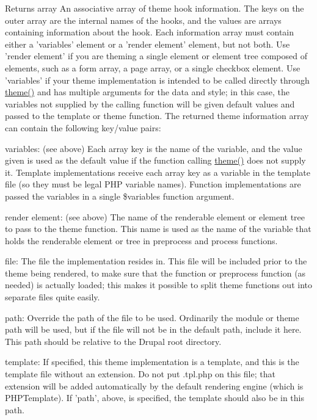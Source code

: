 \begin{DoxyReturn}{Returns}
array An associative array of theme hook information. The keys on the outer array are the internal names of the hooks, and the values are arrays containing information about the hook. Each information array must contain either a 'variables' element or a 'render element' element, but not both. Use 'render element' if you are theming a single element or element tree composed of elements, such as a form array, a page array, or a single checkbox element. Use 'variables' if your theme implementation is intended to be called directly through \hyperlink{includes_2theme_8inc_a7c25609a935874541a19657affd30fff}{theme()} and has multiple arguments for the data and style; in this case, the variables not supplied by the calling function will be given default values and passed to the template or theme function. The returned theme information array can contain the following key/value pairs:
\begin{DoxyItemize}
\item variables: (see above) Each array key is the name of the variable, and the value given is used as the default value if the function calling \hyperlink{includes_2theme_8inc_a7c25609a935874541a19657affd30fff}{theme()} does not supply it. Template implementations receive each array key as a variable in the template file (so they must be legal PHP variable names). Function implementations are passed the variables in a single \$variables function argument.
\item render element: (see above) The name of the renderable element or element tree to pass to the theme function. This name is used as the name of the variable that holds the renderable element or tree in preprocess and process functions.
\item file: The file the implementation resides in. This file will be included prior to the theme being rendered, to make sure that the function or preprocess function (as needed) is actually loaded; this makes it possible to split theme functions out into separate files quite easily.
\item path: Override the path of the file to be used. Ordinarily the module or theme path will be used, but if the file will not be in the default path, include it here. This path should be relative to the Drupal root directory.
\item template: If specified, this theme implementation is a template, and this is the template file without an extension. Do not put .tpl.php on this file; that extension will be added automatically by the default rendering engine (which is PHPTemplate). If 'path', above, is specified, the template should also be in this path.

\end{DoxyItemize}
\end{DoxyReturn}
